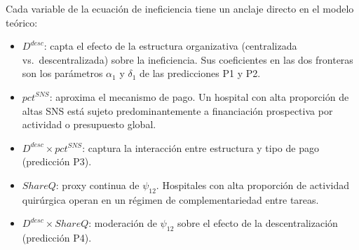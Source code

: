 Cada variable de la ecuación de ineficiencia tiene un anclaje directo en el modelo teórico:
\begin{itemize}
  \item $D^{desc}$: capta el efecto de la estructura organizativa (centralizada vs.\ descentralizada) sobre la ineficiencia. Sus coeficientes en las dos fronteras son los parámetros $\alpha_1$ y $\delta_1$ de las predicciones P1 y P2.
  \item $pct^{SNS}$: aproxima el mecanismo de pago. Un hospital con alta proporción de altas SNS está sujeto predominantemente a financiación prospectiva por actividad o presupuesto global.
  \item $D^{desc}\times pct^{SNS}$: captura la interacción entre estructura y tipo de pago (predicción P3).
  \item $ShareQ$: proxy continua de $\psi_{12}$. Hospitales con alta proporción de actividad quirúrgica operan en un régimen de complementariedad entre tareas.
  \item $D^{desc}\times ShareQ$: moderación de $\psi_{12}$ sobre el efecto de la descentralización (predicción P4).
\end{itemize}

